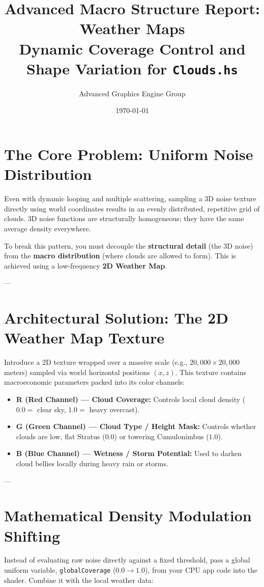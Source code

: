 \documentclass[11pt,a4paper]{article}
\title{Advanced Macro Structure Report: Weather Maps \\ \large Dynamic Coverage Control and Shape Variation for \texttt{Clouds.hs}}
\author{Advanced Graphics Engine Group}
\date{\today}
\begin{document}
\maketitle

\section{The Core Problem: Uniform Noise Distribution}
Even with dynamic looping and multiple scattering, sampling a 3D noise texture directly using world coordinates results in an evenly distributed, repetitive grid of clouds. 3D noise functions are structurally homogeneous; they have the same average density everywhere.

To break this pattern, you must decouple the \textbf{structural detail} (the 3D noise) from the \textbf{macro distribution} (where clouds are allowed to form). This is achieved using a low-frequency \textbf{2D Weather Map}.

---

\section{Architectural Solution: The 2D Weather Map Texture}
Introduce a 2D texture wrapped over a massive scale (e.g., $20,000 \times 20,000$ meters) sampled via world horizontal positions $(x, z)$. This texture contains macroeconomic parameters packed into its color channels:

\begin{itemize}
    \item \textbf{R (Red Channel) --- Cloud Coverage:} Controls local cloud density ($0.0 = $ clear sky, $1.0 = $ heavy overcast).
    \item \textbf{G (Green Channel) --- Cloud Type / Height Mask:} Controls whether clouds are low, flat Stratus ($0.0$) or towering Cumulonimbus ($1.0$).
    \item \textbf{B (Blue Channel) --- Wetness / Storm Potential:} Used to darken cloud bellies locally during heavy rain or storms.
\end{itemize}

---

\section{Mathematical Density Modulation Shifting}
Instead of evaluating raw noise directly against a fixed threshold, pass a global uniform variable, \texttt{globalCoverage} ($0.0 \to 1.0$), from your CPU app code into the shader. Combine it with the local weather data:
\end{document}

